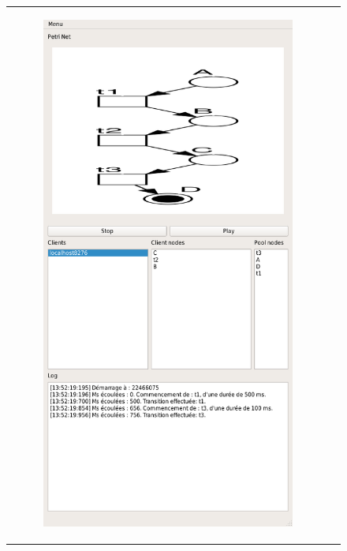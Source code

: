 	\begin{figure}
		\centering
		\begin{tabular}{rl}
		\begin{subfigure}{0.5\textwidth}
			\centering
			\includegraphics[scale=0.45]{images/resultats/server_simple_wifi.png}

\end{subfigure}
\end{tabular}
\end{figure}
